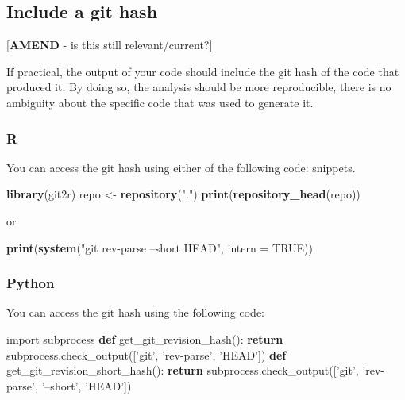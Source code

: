 \documentclass[]{book}
\newenvironment{Shaded}{\begin{snugshade}}{\end{snugshade}}
\newcommand{\ControlFlowTok}[1]{\textcolor[rgb]{0.13,0.29,0.53}{\textbf{#1}}}
\newcommand{\DataTypeTok}[1]{\textcolor[rgb]{0.13,0.29,0.53}{#1}}
\newcommand{\ImportTok}[1]{#1}
\newcommand{\KeywordTok}[1]{\textcolor[rgb]{0.13,0.29,0.53}{\textbf{#1}}}
\newcommand{\NormalTok}[1]{#1}
\newcommand{\OtherTok}[1]{\textcolor[rgb]{0.56,0.35,0.01}{#1}}
\newcommand{\StringTok}[1]{\textcolor[rgb]{0.31,0.60,0.02}{#1}}
\begin{document}
\hypertarget{githash}{%
\subsection*{Include a git hash}\label{githash}}

{[}\textbf{AMEND} - is this still relevant/current?{]}

If practical, the output of your code should include the git hash of the code that produced it. By doing so, the analysis should be
more reproducible, there is no ambiguity about the specific code that was used to generate it.

\hypertarget{r}{%
\subsubsection*{R}\label{r}}

You can access the git hash using either of the following code:
snippets.

\begin{Shaded}
\begin{Highlighting}[]
\KeywordTok{library}\NormalTok{(git2r)}
\NormalTok{repo <-}\StringTok{ }\KeywordTok{repository}\NormalTok{(}\StringTok{"."}\NormalTok{)}
\KeywordTok{print}\NormalTok{(}\KeywordTok{repository_head}\NormalTok{(repo))}
\end{Highlighting}
\end{Shaded}

or

\begin{Shaded}
\begin{Highlighting}[]
\KeywordTok{print}\NormalTok{(}\KeywordTok{system}\NormalTok{(}\StringTok{"git rev-parse --short HEAD"}\NormalTok{, }\DataTypeTok{intern =} \OtherTok{TRUE}\NormalTok{))}
\end{Highlighting}
\end{Shaded}

\hypertarget{python}{%
\subsubsection*{Python}\label{python}}

You can access the git hash using the following code:

\begin{Shaded}
\begin{Highlighting}[]
\ImportTok{import}\NormalTok{ subprocess}
\KeywordTok{def}\NormalTok{ get_git_revision_hash():}
    \ControlFlowTok{return}\NormalTok{ subprocess.check_output([}\StringTok{'git'}\NormalTok{, }\StringTok{'rev-parse'}\NormalTok{, }\StringTok{'HEAD'}\NormalTok{])}
\KeywordTok{def}\NormalTok{ get_git_revision_short_hash():}
    \ControlFlowTok{return}\NormalTok{ subprocess.check_output([}\StringTok{'git'}\NormalTok{, }\StringTok{'rev-parse'}\NormalTok{, }\StringTok{'--short'}\NormalTok{, }\StringTok{'HEAD'}\NormalTok{])}
\end{Highlighting}
\end{Shaded}
\end{document}
